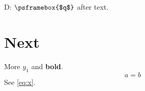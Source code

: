 \documentclass{article}
\begin{document}
D: $\psframebox{$q$}$ after text.

\section{Next}
More $y_1$ and \textbf{bold}.
\begin{equation} a=b \label{eq:x}\end{equation}
See \ref{eq:x}.
\end{document}
